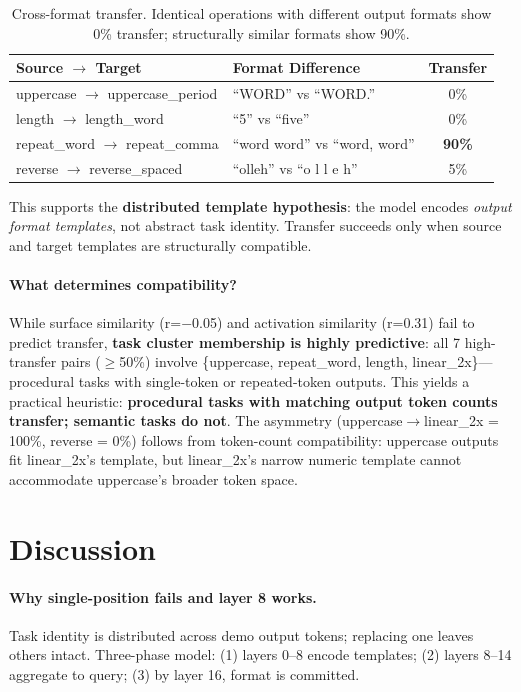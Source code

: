 \documentclass[runningheads]{llncs}
\begin{document}
\begin{table}[t]
\caption{Cross-format transfer. Identical operations with different output formats show 0\% transfer; structurally similar formats show 90\%.}
\label{tab:format}
\centering
\begin{tabular}{@{}llc@{}}
\toprule
Source $\to$ Target & Format Difference & Transfer \\
\midrule
uppercase $\to$ uppercase\_period & ``WORD'' vs ``WORD.'' & 0\% \\
length $\to$ length\_word & ``5'' vs ``five'' & 0\% \\
repeat\_word $\to$ repeat\_comma & ``word word'' vs ``word, word'' & \textbf{90\%} \\
reverse $\to$ reverse\_spaced & ``olleh'' vs ``o l l e h'' & 5\% \\
\bottomrule
\end{tabular}
\end{table}

This supports the \textbf{distributed template hypothesis}: the model encodes \emph{output format templates}, not abstract task identity. Transfer succeeds only when source and target templates are structurally compatible.

\paragraph{What determines compatibility?} While surface similarity (r=$-$0.05) and activation similarity (r=0.31) fail to predict transfer, \textbf{task cluster membership is highly predictive}: all 7 high-transfer pairs ($\geq$50\%) involve \{uppercase, repeat\_word, length, linear\_2x\}---procedural tasks with single-token or repeated-token outputs. This yields a practical heuristic: \textbf{procedural tasks with matching output token counts transfer; semantic tasks do not}. The asymmetry (uppercase$\to$linear\_2x = 100\%, reverse = 0\%) follows from token-count compatibility: uppercase outputs fit linear\_2x's template, but linear\_2x's narrow numeric template cannot accommodate uppercase's broader token space.

\section{Discussion}

\paragraph{Why single-position fails and layer 8 works.}
Task identity is distributed across demo output tokens; replacing one leaves others intact. Three-phase model: (1) layers 0--8 encode templates; (2) layers 8--14 aggregate to query; (3) by layer 16, format is committed.
\end{document}
